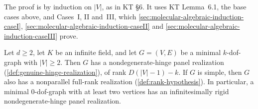 The proof is by induction on $|V|$, as in KT \S6. It uses KT Lemma~6.1,
the base cases above, and Cases~I, II and~III, which
\cref{sec:molecular-algebraic-induction-caseI},
\cref{sec:molecular-algebraic-induction-caseII} and
\cref{sec:molecular-algebraic-induction-caseIII} prove.

\begin{theorem}
  \label{thm:theorem-55}
  \leanok
  Let $d \ge 2$, let $K$ be an infinite field, and let $G = (V, E)$ be a
  minimal $k$-dof-graph with $|V| \ge 2$. Then $G$ has a
  nondegenerate-hinge panel realization
  (\cref{def:genuine-hinge-realization}), of rank $D(|V| - 1) - k$. If
  $G$ is simple, then $G$ also has a nonparallel full-rank realization
  (\cref{def:rank-hypothesis}). In particular, a minimal $0$-dof-graph
  with at least two vertices has an infinitesimally rigid
  nondegenerate-hinge panel realization.
\end{theorem}
